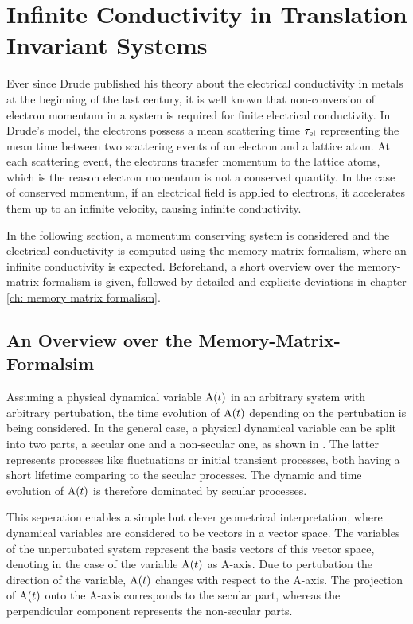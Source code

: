 %
%
%
\chapter{Infinite Conductivity in Translation Invariant Systems}
\label{ch:infinite conductivity}
%
%
%
Ever since Drude published his theory about the electrical conductivity in metals \cite{Drude} at the beginning of the last century, it is well known that non-conversion of electron momentum in a system is required for finite electrical conductivity.
In Drude's model, the electrons possess a mean scattering time $\tau_{\mathrm{el}}$ representing the mean time between two scattering events of an electron and a lattice atom.
At each scattering event, the electrons transfer momentum to the lattice atoms, which is the reason electron momentum is not a conserved quantity.
In the case of conserved momentum, if an electrical field is applied to electrons, it accelerates them up to an infinite velocity, causing infinite conductivity.

In the following section, a momentum conserving system is considered and the electrical conductivity is computed using the memory-matrix-formalism, where an infinite conductivity is expected.
Beforehand, a short overview over the memory-matrix-formalism is given, followed by detailed and explicite deviations in chapter \ref{ch: memory matrix formalism}.
%
%
\section{An Overview over the Memory-Matrix-Formalsim}
\label{sec:overview MMF}
%
%
Assuming a physical dynamical variable $\mathrm{A}(t)$ in an arbitrary system with arbitrary pertubation, the time evolution of $\mathrm{A}(t)$ depending on the pertubation is being considered.
In the general case, a physical dynamical variable can be split into two parts, a secular one and a non-secular one, as shown in \cite{Mori}.
The latter represents processes like fluctuations or initial transient processes, both having a short lifetime comparing to the secular processes.  %
The dynamic and time evolution of $\mathrm{A}(t)$ is therefore dominated by secular processes.

This seperation enables a simple but clever geometrical interpretation, where dynamical variables are considered to be vectors in a vector space.
The variables of the unpertubated system represent the basis vectors of this vector space, denoting in the case of the variable $\mathrm{A}(t)$ as A-axis.  %
Due to pertubation the direction of the variable, $\mathrm{A}(t)$ changes with respect to the A-axis.
The projection of $\mathrm{A}(t)$ onto the A-axis corresponds to the secular part, whereas the perpendicular component represents the non-secular parts.

